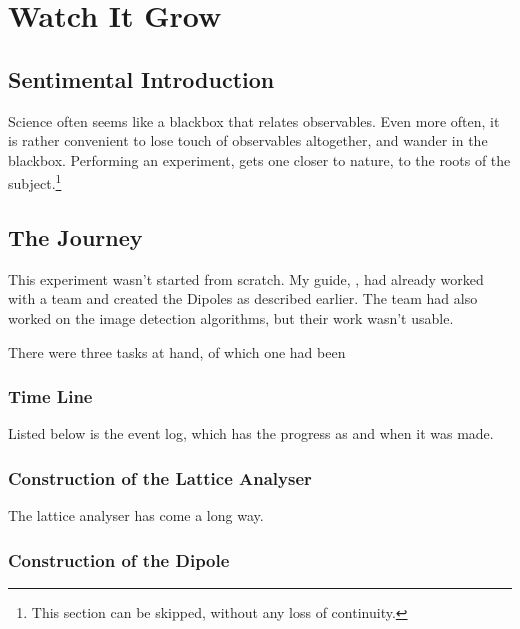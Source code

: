 \chapter{Watch It Grow}

\section{Sentimental Introduction}
	Science often seems like a blackbox that relates observables. Even more often, it is rather convenient to lose touch of observables altogether, and wander in the blackbox. Performing an experiment, gets one closer to nature, to the roots of the subject.\footnote{This section can be skipped, without any loss of continuity.}

\section{The Journey}
	This experiment wasn't started from scratch. My guide, \myProf, had already worked with a team and created the Dipoles as described earlier. The team had also worked on the image detection algorithms, but their work wasn't usable.
	\par
	There were three tasks at hand, of which one had been 
	\subsection{Time Line}
		Listed below is the event log, which has the progress as and when it was made.
		
	
	\subsection{Construction of the Lattice Analyser}
		The lattice analyser has come a long way.
		

	\subsection{Construction of the Dipole}